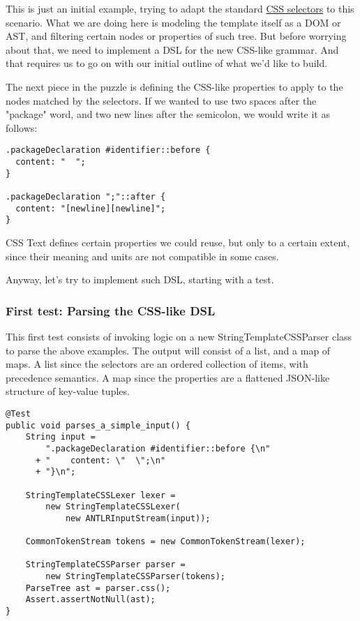 \documentclass[11pt]{article}
\begin{document}
This is just an initial example, trying to adapt the standard \href{http://www.w3.org/TR/2011/REC-css3-selectors-20110929/}{CSS selectors} to this scenario. What we are doing here is
modeling the template itself as a DOM or AST, and filtering certain nodes or properties of such tree. But before worrying
about that, we need to implement a DSL for the new CSS-like grammar. And that requires us to go on with our initial
outline of what we'd like to build.

The next piece in the puzzle is defining the CSS-like properties to apply to the nodes matched by the selectors.
If we wanted to use two spaces after the "package" word, and two new lines after the semicolon, we would write it as follows:

\begin{verbatim}
.packageDeclaration #identifier::before {
  content: "  ";
}

.packageDeclaration ";"::after {
  content: "[newline][newline]";
}
\end{verbatim}

CSS Text defines certain properties we could reuse, but only to a certain extent, since their meaning and units are
not compatible in some cases.

Anyway, let's try to implement such DSL, starting with a test.

\subsubsection{First test: Parsing the CSS-like DSL}
\label{sec-1-4-2}

This first test consists of invoking logic on a new StringTemplateCSSParser class to parse the above examples. The output
will consist of a list, and a map of maps. A list since the selectors are an ordered collection of items, with precedence semantics.
A map since the properties are a flattened JSON-like structure of key-value tuples.

\begin{verbatim}
@Test
public void parses_a_simple_input() {
    String input =
        ".packageDeclaration #identifier::before {\n"
      + "    content: \"  \";\n"
      + "}\n";

    StringTemplateCSSLexer lexer =
        new StringTemplateCSSLexer(
            new ANTLRInputStream(input));

    CommonTokenStream tokens = new CommonTokenStream(lexer);

    StringTemplateCSSParser parser =
        new StringTemplateCSSParser(tokens);
    ParseTree ast = parser.css();
    Assert.assertNotNull(ast);
}
\end{verbatim}
\end{document}

